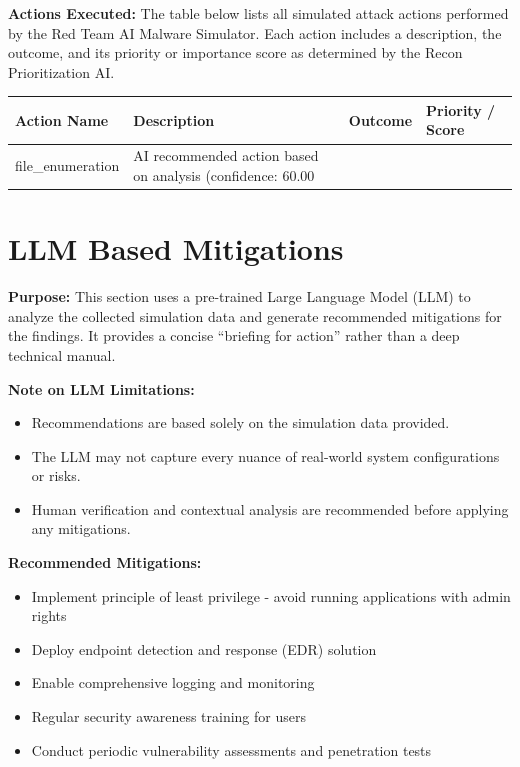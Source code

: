 \documentclass[a4paper,12pt]{article}
\begin{document}
\vspace{0.3cm}
\textbf{Actions Executed:} The table below lists all simulated attack actions performed by the Red Team AI Malware Simulator. Each action includes a description, the outcome, and its priority or importance score as determined by the Recon Prioritization AI.

\begin{longtable}{|p{4cm}|p{6cm}|p{2cm}|p{2cm}|}
\hline
\textbf{Action Name} & \textbf{Description} & \textbf{Outcome} & \textbf{Priority / Score} \\
\hline

    
file_enumeration & AI recommended action based on analysis (confidence: 60.00%
\hline
    

\end{longtable}

\newpage


\section*{LLM Based Mitigations}

\textbf{Purpose:} This section uses a pre-trained Large Language Model (LLM) to analyze the collected simulation data and generate recommended mitigations for the findings. It provides a concise “briefing for action” rather than a deep technical manual.

\vspace{0.3cm}
\textbf{Note on LLM Limitations:}  
\begin{itemize}
    \item Recommendations are based solely on the simulation data provided.
    \item The LLM may not capture every nuance of real-world system configurations or risks.
    \item Human verification and contextual analysis are recommended before applying any mitigations.
\end{itemize}

\vspace{0.3cm}
\textbf{Recommended Mitigations:}
\begin{itemize}

    
    \item Implement principle of least privilege - avoid running applications with admin rights
    
    \item Deploy endpoint detection and response (EDR) solution
    
    \item Enable comprehensive logging and monitoring
    
    \item Regular security awareness training for users
    
    \item Conduct periodic vulnerability assessments and penetration tests
    

\end{itemize}
\end{document}
